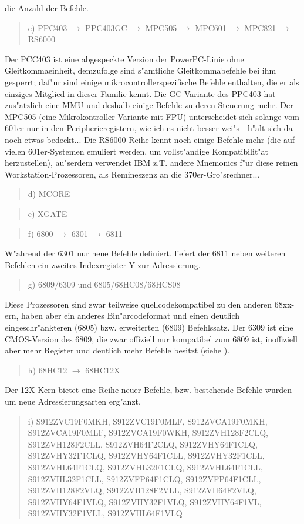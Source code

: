 \documentclass[12pt,a4paper,twoside]{report}
\begin{document}
die Anzahl der Befehle.
\begin{quote}
c) PPC403 $\rightarrow$ PPC403GC $\rightarrow$ MPC505 $\rightarrow$ MPC601 $\rightarrow$ MPC821 $\rightarrow$ RS6000
\end{quote}
Der PCC403 ist eine abgespeckte Version der PowerPC-Linie ohne
Gleitkommaeinheit, demzufolge sind s"amtliche Gleitkommabefehle
bei ihm gesperrt; daf"ur sind einige mikrocontrollerspezifische
Befehle enthalten, die er als einziges Mitglied in dieser Familie
kennt.  Die GC-Variante des PPC403 hat zus"atzlich eine MMU und deshalb
einige Befehle zu deren Steuerung mehr.  Der MPC505 (eine Mikrokontroller-Variante mit FPU)
unterscheidet sich solange vom 601er nur in den Peripherieregistern,
wie ich es nicht besser wei"s - \cite{Mot505} h"alt sich da noch etwas bedeckt...
Die RS6000-Reihe kennt noch einige Befehle mehr (die auf vielen
601er-Systemen emuliert werden, um vollst"andige Kompatibilit"at
herzustellen), au"serdem verwendet IBM z.T. andere Mnemonics f"ur
diese reinen Workstation-Prozessoren, als Remineszenz an die
370er-Gro"srechner...
\begin{quote}
d) MCORE
\end{quote}
\begin{quote}
e) XGATE
\end{quote}
\begin{quote}
f) 6800 $\rightarrow$ 6301 $\rightarrow$ 6811
\end{quote}
W"ahrend der 6301 nur neue Befehle definiert, liefert der 6811 neben
weiteren Befehlen ein zweites Indexregister Y zur Adressierung.
\begin{quote}
g) 6809/6309 und 6805/68HC08/68HCS08
\end{quote}
Diese Prozessoren sind zwar teilweise quellcodekompatibel zu den
anderen 68xx-ern, haben aber ein anderes Bin"arcodeformat und einen
deutlich eingeschr"ankteren (6805) bzw. erweiterten (6809) Befehlssatz.
Der 6309 ist eine CMOS-Version des 6809, die zwar offiziell
nur kompatibel zum 6809 ist, inoffiziell aber mehr Register und
deutlich mehr Befehle besitzt (siehe \cite{Kaku}).
\begin{quote}
h) 68HC12 $\longrightarrow$ 68HC12X
\end{quote}
Der 12X-Kern bietet eine Reihe neuer Befehle, bzw. bestehende Befehle
wurden um neue Adressierungsarten erg"anzt.
\begin{quote}
i) S912ZVC19F0MKH, S912ZVC19F0MLF, S912ZVCA19F0MKH,\\
   S912ZVCA19F0MLF, S912ZVCA19F0WKH, S912ZVH128F2CLQ,\\
   S912ZVH128F2CLL, S912ZVH64F2CLQ,  S912ZVHY64F1CLQ,\\
   S912ZVHY32F1CLQ, S912ZVHY64F1CLL, S912ZVHY32F1CLL,\\
   S912ZVHL64F1CLQ, S912ZVHL32F1CLQ, S912ZVHL64F1CLL,\\
   S912ZVHL32F1CLL, S912ZVFP64F1CLQ, S912ZVFP64F1CLL,\\
   S912ZVH128F2VLQ, S912ZVH128F2VLL, S912ZVH64F2VLQ,\\
   S912ZVHY64F1VLQ, S912ZVHY32F1VLQ, S912ZVHY64F1VL,\\
   S912ZVHY32F1VLL, S912ZVHL64F1VLQ 
\end{quote}
\end{document}
